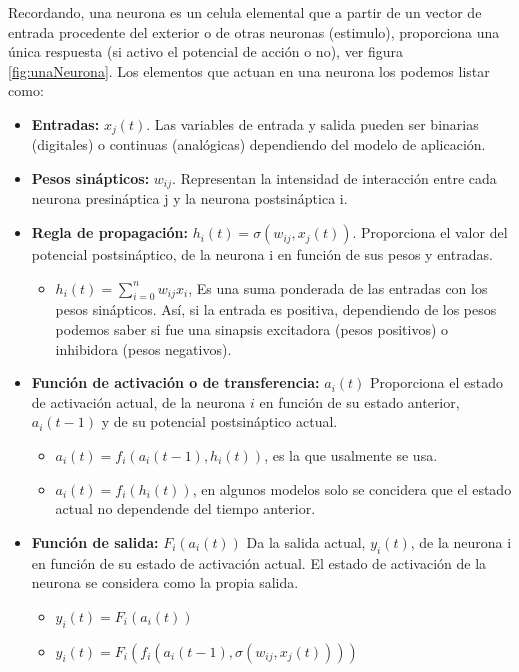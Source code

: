 Recordando, una neurona es un celula elemental que a partir de un vector de entrada procedente del exterior o de otras neuronas (estimulo), proporciona una única respuesta (si activo el potencial de acción o no), ver figura \ref{fig:unaNeurona}. Los elementos que actuan en una neurona los podemos listar como:
\begin{itemize}
 \item \textbf{Entradas:} $x_{j}(t)$. Las variables de entrada y salida pueden ser binarias (digitales) o continuas (analógicas) dependiendo del modelo de aplicación.
 \item \textbf{Pesos sinápticos:} $w_{ij}$. Representan la intensidad de interacción entre cada neurona presináptica j y la neurona postsináptica i.
 \item \textbf{Regla de propagación:} $h_{i}(t) = \sigma(w_{ij}, x_{j}(t))$. Proporciona el valor del potencial postsináptico, de la neurona i en función de sus pesos y entradas. 
    \begin{itemize}
     \item $h_{i}(t) = \sum_{i=0}^{n} w_{ij} x_{i} $, Es una suma ponderada de las entradas con los pesos sinápticos.
      Así, si la entrada es positiva, dependiendo de los pesos podemos saber si fue una sinapsis excitadora (pesos positivos) o inhibidora (pesos negativos).
    \end{itemize}

 \item \textbf{Función de activación o de transferencia:} $a_{i}(t)$ Proporciona el estado de activación actual, de la neurona $i$ en función de su estado anterior, $a_{i}(t-1)$ y de su potencial postsináptico actual. 
    \begin{itemize}
     \item $a_{i}(t) = f_{i}(a_{i}(t-1),h_{i}(t))$, es la que usalmente se usa.
     \item $a_{i}(t) = f_{i}(h_{i}(t))$, en algunos modelos solo se concidera que el estado actual no dependende del tiempo anterior.

     \end{itemize}

 \item \textbf{Función de salida: } $F_{i}(a_{i}(t))$ Da la salida actual, $y_{i}(t)$, de la neurona i en función de su estado de activación actual. El estado de activación de la neurona se considera como la propia salida. 
    \begin{itemize}
     \item $y_{i}(t) = F_{i}(a_{i}(t))$
     \item $y_{i}(t) = F_{i}(f_{i}(a_{i}(t-1),\sigma(w_{ij},x_{j}(t))))$
    \end{itemize}

\end{itemize}



